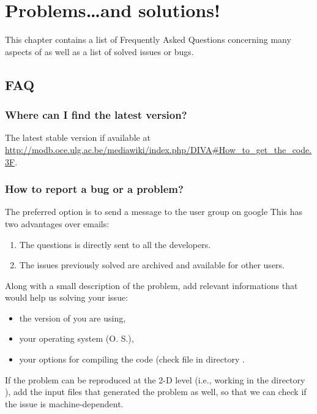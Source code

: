 \chapter{Problems\ldots and solutions!}

This chapter contains a list of Frequently Asked Questions concerning many aspects of \diva as well as a list of solved issues or bugs.

\minitoc


\section{FAQ}

\subsection{Where can I find the latest version?}

The latest stable version if available at \url{http://modb.oce.ulg.ac.be/mediawiki/index.php/DIVA#How_to_get_the_code.3F}. 


\subsection{How to report a bug or a problem?}

The preferred option is to send a message to the \diva user group on google%
This has two advantages over emails:
\begin{enumerate}
\item The questions is directly sent to all the \diva developers.
\item The issues previously solved are archived and available for other users.
\end{enumerate}

Along with a small description of the problem, add relevant informations that would help us solving your issue:
\begin{itemize}
\item the version of \diva you are using,
\item your operating system (O. S.),
\item your options for compiling the code (check file  in directory .
\end{itemize}
If the problem can be reproduced at the 2-D level (i.e., working in the directory ), add the input files that generated the problem as well, so that we can check if the issue is machine-dependent. 

